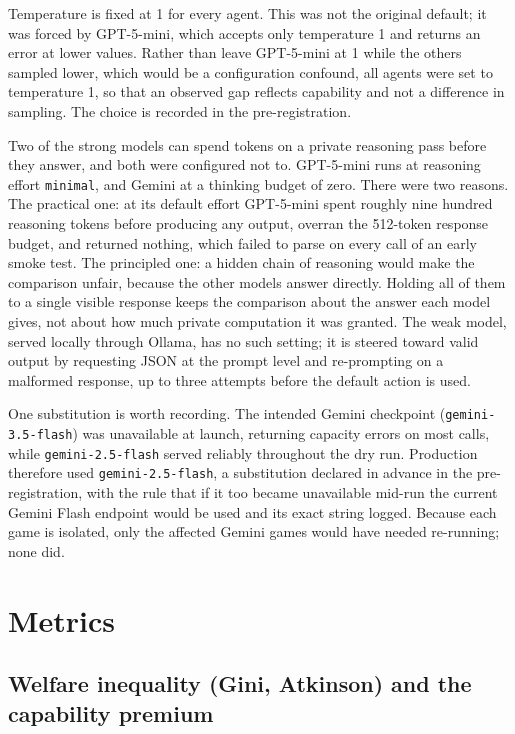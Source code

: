 Temperature is fixed at 1 for every agent. This was not the original default; it was forced
by GPT-5-mini, which accepts only temperature 1 and returns an error at lower values. Rather
than leave GPT-5-mini at 1 while the others sampled lower, which would be a configuration
confound, all agents were set to temperature 1, so that an observed gap reflects capability
and not a difference in sampling. The choice is recorded in the pre-registration.

Two of the strong models can spend tokens on a private reasoning pass before they answer,
and both were configured not to. GPT-5-mini runs at reasoning effort \texttt{minimal}, and
Gemini at a thinking budget of zero. There were two reasons. The practical one: at its
default effort GPT-5-mini spent roughly nine hundred reasoning tokens before producing any
output, overran the 512-token response budget, and returned nothing, which failed to parse
on every call of an early smoke test. The principled one: a hidden chain of reasoning would
make the comparison unfair, because the other models answer directly. Holding all of them
to a single visible response keeps the comparison about the answer each model gives, not
about how much private computation it was granted. The weak model, served locally through
Ollama, has no such setting; it is steered toward valid output by requesting JSON at the
prompt level and re-prompting on a malformed response, up to three attempts before the
default action is used.

One substitution is worth recording. The intended Gemini checkpoint
(\texttt{gemini-3.5-flash}) was unavailable at launch, returning capacity errors on most
calls, while \texttt{gemini-2.5-flash} served reliably throughout the dry run. Production
therefore used \texttt{gemini-2.5-flash}, a substitution declared in advance in the
pre-registration, with the rule that if it too became unavailable mid-run the current Gemini
Flash endpoint would be used and its exact string logged. Because each game is isolated,
only the affected Gemini games would have needed re-running; none did.

\section{Metrics}
\label{sec:metrics}

\subsection{Welfare inequality (Gini, Atkinson) and the capability premium}
\label{subsec:inequality}

